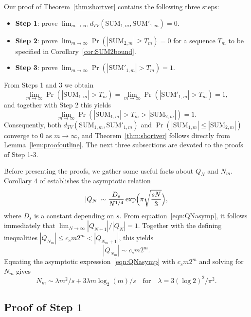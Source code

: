 \documentclass{article}
\theoremstyle{definition}
\renewcommand{\ge}{\geqslant}
\renewcommand{\leq}{\leqslant}
\begin{document}
Our proof of Theorem~\ref{thm:shortver} contains the following three steps:
\begin{itemize}
    \item \textbf{Step 1}: prove $\lim_{m\to\infty}d_{TV}(\mathrm{SUM}_{1,m},\mathrm{SUM}'_{1,m})=0.$
    \item \textbf{Step 2}: prove $\lim_{m\to\infty}\Pr(|\mathrm{SUM}_{2,m}|\ge T_m)=0$ for a sequence $T_m$ to be specified in Corollary~\ref{cor:SUM2bound}.
    \item \textbf{Step 3}: prove $\lim_{m\to\infty}\Pr(|\mathrm{SUM}'_{1,m}|>T_m)=1$.
\end{itemize}
From Steps 1 and 3 we obtain
$$\lim_{m\to\infty}\Pr(|\mathrm{SUM}_{1,m}|>T_m)=\lim_{m\to\infty}\Pr(|\mathrm{SUM}'_{1,m}|>T_m)=1,$$
and together with Step 2 this yields
$$\lim_{m\to\infty}\Pr(|\mathrm{SUM}_{1,m}|>T_m>|\mathrm{SUM}_{2,m}|)=1.$$
Consequently, both $ d_{TV}(\mathrm{SUM}_{1,m},\mathrm{SUM}'_{1,m})$ and $\Pr(|\mathrm{SUM}_{1,m}|\leq |\mathrm{SUM}_{2,m}| )$ converge to $0$ as $m\to\infty$, and Theorem~\ref{thm:shortver} follows directly from Lemma~\ref{lem:proofoutline}. The next three subsections are devoted to the proofs of Step 1-3.

Before presenting the proofs, we gather some useful facts about $Q_N$ and $N_m$.  Corollary 4 of \cite{superpolymulti} establishes the asymptotic relation
    \begin{equation}\label{eqn:QNasymp}
        |Q_N|\sim \frac{D_s}{N^{1/4}}\exp\Bigl(\pi\sqrt{\frac{sN}{3}}\Bigr),
    \end{equation}
    where $D_s$ is a constant depending on $s$. From equation~\eqref{eqn:QNasymp}, it follows immediately that $\lim_{N\to\infty} |Q_{N+1}|/|Q_{N}|=1$. Together with the defining inequalities $|Q_{N_m}|\leq c_s m 2^m < |Q_{N_m+1}|$, this yields
    \begin{equation}\label{eqn:QNm}
        |Q_{N_m}|\sim c_s m 2^m.
    \end{equation}
Equating the asymptotic expression~\eqref{eqn:QNasymp} with $c_sm 2^m$ and solving for $N_m$ gives
    \begin{equation}\label{eqn:Nm}
    N_m\sim \lambda m^2/s+ 3\lambda m\log_2(m)/s \quad\text{for} \quad\lambda=3(\log 2)^2/\pi^2.
\end{equation}



\subsection{Proof of Step 1}\label{subsec:step1}
\end{document}

